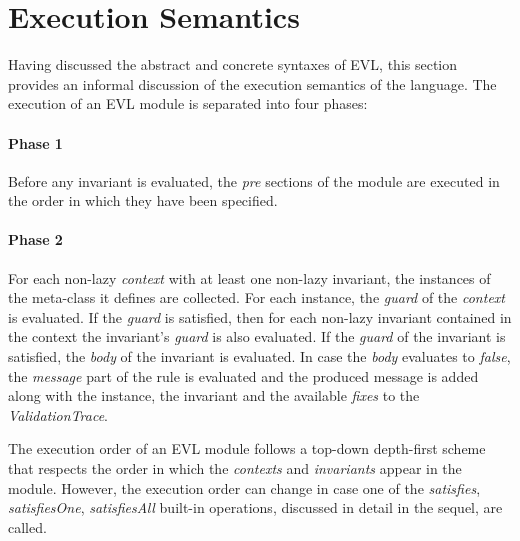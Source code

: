 \section{Execution Semantics}
\label{sec:Design.EVL.ExecutionSemantics}

Having discussed the abstract and concrete syntaxes of EVL, this section provides an informal discussion of the execution semantics of the language. The execution of an EVL module is separated into four phases:


\paragraph{Phase 1} Before any invariant is evaluated, the \emph{pre} sections of the module are executed in the order in which they have been specified.

\paragraph {Phase 2} For each non-lazy \emph{context} with at least one non-lazy invariant, the instances of the meta-class it defines are collected. For each instance, the \emph{guard} of the \emph{context} is evaluated. If the \emph{guard} is satisfied, then for each non-lazy invariant contained in the context the invariant's \emph{guard} is also evaluated. If the \emph{guard} of the invariant is satisfied, the \emph{body} of the invariant is evaluated. In case the \emph{body} evaluates to \emph{false}, the \emph{message} part of the rule is evaluated and the produced message is added along with the instance, the invariant and the available \emph{fixes} to the \emph{ValidationTrace}.

The execution order of an EVL module follows a top-down depth-first scheme that respects the order in which the \emph{contexts} and \emph{invariants} appear in the module. However, the execution order can change in case one of the \emph{satisfies}, \emph{satisfiesOne}, \emph{satisfiesAll} built-in operations, discussed in detail in the sequel, are called.

